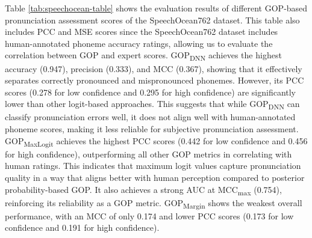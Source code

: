 \documentclass{Interspeech}
\begin{document}
Table \ref{tab:speechocean-table} shows the evaluation results of different GOP-based pronunciation assessment scores of the SpeechOcean762 dataset. This table also includes PCC and MSE scores since 
the SpeechOcean762 dataset includes human-annotated phoneme accuracy ratings, allowing us to evaluate the correlation between GOP and expert scores.
GOP\textsubscript{DNN} achieves the highest accuracy (0.947), precision (0.333), and MCC (0.367), showing that it effectively separates correctly pronounced and mispronounced phonemes. However, its PCC scores (0.278 for low confidence and 0.295 for high confidence) are significantly lower than other logit-based approaches. This suggests that while GOP\textsubscript{DNN} can classify pronunciation errors well, it does not align well with human-annotated phoneme scores, making it less reliable for subjective pronunciation assessment. GOP\textsubscript{MaxLogit} achieves the highest PCC scores (0.442 for low confidence and 0.456 for high confidence), outperforming all other GOP metrics in correlating with human ratings. This indicates that maximum logit values capture pronunciation quality in a way that aligns better with human perception compared to posterior probability-based GOP. It also achieves a strong AUC at MCC\textsubscript{max} (0.754), reinforcing its reliability as a GOP metric. GOP\textsubscript{Margin} shows the weakest overall performance, with an MCC of only 0.174 and lower PCC scores (0.173 for low confidence and 0.191 for high confidence).
\end{document}
